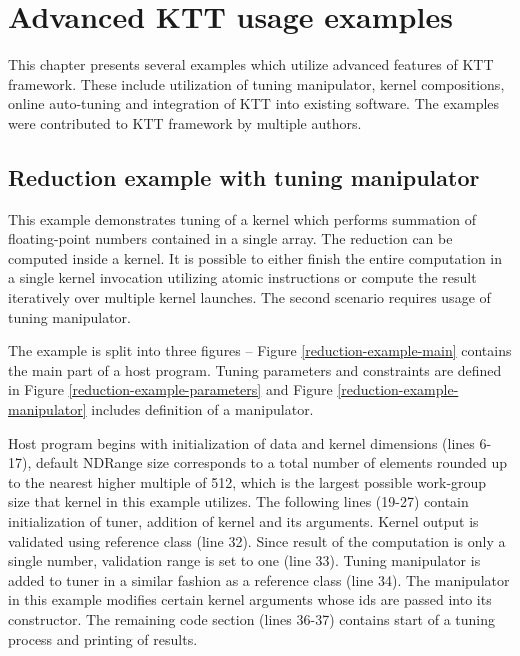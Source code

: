 \documentclass
[
    digital, %
    oneside, %
    table, %
    nolof, %
    nolot, %
    nocover %
]{fithesis3}
\begin{document}
\chapter{Advanced KTT usage examples}
\label{ktt-advanced-usage}
This chapter presents several examples which utilize advanced features of KTT framework. These include utilization of tuning manipulator, kernel
compositions, online auto-tuning and integration of KTT into existing software. The examples were contributed to KTT framework by multiple authors.

\section{Reduction example with tuning manipulator}
This example demonstrates tuning of a kernel which performs summation of floating-point numbers contained in a single array. The reduction can be
computed inside a kernel. It is possible to either finish the entire computation in a single kernel invocation utilizing atomic instructions or
compute the result iteratively over multiple kernel launches. The second scenario requires usage of tuning manipulator.

The example is split into three figures -- Figure \ref{reduction-example-main} contains the main part of a host program. Tuning parameters and
constraints are defined in Figure \ref{reduction-example-parameters} and Figure \ref{reduction-example-manipulator} includes definition of a
manipulator.

Host program begins with initialization of data and kernel dimensions (lines 6-17), default NDRange size corresponds to a total number of elements
rounded up to the nearest higher multiple of 512, which is the largest possible work-group size that kernel in this example utilizes. The following
lines (19-27) contain initialization of tuner, addition of kernel and its arguments. Kernel output is validated using reference class (line 32).
Since result of the computation is only a single number, validation range is set to one (line 33). Tuning manipulator is added to tuner in a similar
fashion as a reference class (line 34). The manipulator in this example modifies certain kernel arguments whose ids are passed into its constructor.
The remaining code section (lines 36-37) contains start of a tuning process and printing of results.
\end{document}

